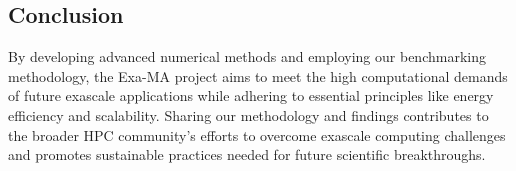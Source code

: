 \subsection*{Conclusion}

By developing advanced numerical methods and employing our  benchmarking methodology, the Exa-MA project aims to meet the high computational demands of future exascale applications while adhering to essential principles like energy efficiency and scalability. Sharing our methodology and findings contributes to the broader HPC community's efforts to overcome exascale computing challenges and promotes sustainable practices needed for future scientific breakthroughs.


